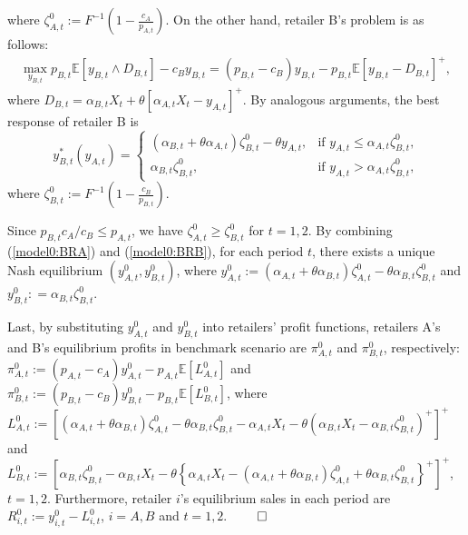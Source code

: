 \documentclass[nonblindrev,copyedit]{informs1}
\begin{document}
\begin{APPENDICES}
where $\zeta^0_{A,t} := F^{-1}(1 - \frac{c_A}{p_{A,t}})$. On the other hand, retailer B's problem is as follows:
\begin{eqnarray*} \label{model0:B}
    \max_{y_{B,t}} p_{B,t} \mathbb{E}\left[y_{B,t} \wedge D_{B,t}  \right] - c_B y_{B,t} = (p_{B,t} -c_B)y_{B,t} - p_{B,t} \mathbb{E} \left[y_{B,t} - D_{B,t}  \right]^+,
\end{eqnarray*}
where $D_{B,t} = \alpha_{B,t} X_t + \theta \left[\alpha_{A,t} X_t - y_{A,t} \right]^+$. By analogous arguments, the best response of retailer B is
\begin{equation}  \label{model0:BRB}
    y^*_{B,t}(y_{A,t}) =  \begin{cases}
        (\alpha_{B,t} + \theta \alpha_{A,t}) \zeta^0_{B,t} - \theta y_{A,t}, &  \text{if $y_{A,t} \leq \alpha_{A,t} \zeta^0_{B,t}$,} \\
        \alpha_{B,t} \zeta^0_{B,t}, &  \text{if $y_{A,t} > \alpha_{A,t} \zeta^0_{B,t}$,}
    \end{cases}
\end{equation}
where $\zeta^0_{B,t} := F^{-1}(1 - \frac{c_B}{p_{B,t}})$.

Since $p_{B,t} c_A/c_B \leq p_{A,t}$, we have $\zeta^0_{A,t} \geq \zeta^0_{B,t}$ for $t = 1, 2$. By combining (\ref{model0:BRA}) and (\ref{model0:BRB}), for each period $t$, there exists a unique Nash equilibrium $(y^0_{A,t},y^0_{B,t})$, where $y^0_{A,t} := (\alpha_{A,t} + \theta \alpha_{B,t}) \zeta^0_{A,t} - \theta \alpha_{B,t} \zeta^0_{B,t}$ and $y^0_{B,t} : = \alpha_{B,t} \zeta^0_{B,t}$.

Last, by substituting $y^0_{A,t}$ and $y^0_{B,t}$ into retailers' profit functions, retailers A's and B's equilibrium profits in benchmark scenario are $\pi^{0}_{A,t}$ and $\pi^{0}_{B,t}$, respectively: $\pi^{0}_{A,t} := (p_{A,t}-c_A)y^0_{A,t} - p_{A,t} \mathbb{E}[L^0_{A,t}]$ and $\pi^{0}_{B,t} := (p_{B,t}-c_B)y^0_{B,t} - p_{B,t} \mathbb{E}[L^0_{B,t}]$,
where $L^0_{A,t} := \left[(\alpha_{A,t} + \theta \alpha_{B,t}) \zeta^0_{A,t} - \theta \alpha_{B,t} \zeta^0_{B,t} - \alpha_{A,t} X_t - \theta (\alpha_{B,t} X_t - \alpha_{B,t} \zeta^0_{B,t})^+ \right]^+$ and $L^0_{B,t} := \left[\alpha_{B,t} \zeta^0_{B,t} - \alpha_{B,t} X_t - \theta \left \{\alpha_{A,t} X_t - (\alpha_{A,t} + \theta \alpha_{B,t}) \zeta^0_{A,t} + \theta \alpha_{B,t} \zeta^0_{B,t} \right \}^+ \right]^+$, $t = 1,2$. Furthermore, retailer $i$'s equilibrium sales in each period are $R^{0}_{i,t} := y^0_{i,t} - L^0_{i,t}$, $i = A,B$ and $t = 1,2$. $\qed$


\end{APPENDICES}
\end{document}
